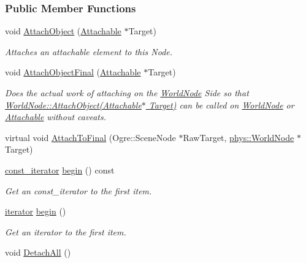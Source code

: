 \subsubsection*{Public Member Functions}
\begin{DoxyCompactItemize}
\item 
void \hyperlink{classphys_1_1WorldNode_a25b5a05bb87967fe21f153ce4418b43e}{AttachObject} (\hyperlink{classphys_1_1Attachable}{Attachable} $\ast$Target)
\begin{DoxyCompactList}\small\item\em Attaches an attachable element to this Node. \item\end{DoxyCompactList}\item 
void \hyperlink{classphys_1_1WorldNode_a6e4aa8bc4b916cfff06d03814a7dd80f}{AttachObjectFinal} (\hyperlink{classphys_1_1Attachable}{Attachable} $\ast$Target)
\begin{DoxyCompactList}\small\item\em Does the actual work of attaching on the \hyperlink{classphys_1_1WorldNode}{WorldNode} Side so that \hyperlink{classphys_1_1WorldNode_a25b5a05bb87967fe21f153ce4418b43e}{WorldNode::AttachObject(Attachable$\ast$ Target)} can be called on \hyperlink{classphys_1_1WorldNode}{WorldNode} or \hyperlink{classphys_1_1Attachable}{Attachable} without caveats. \item\end{DoxyCompactList}\item 
virtual void \hyperlink{classphys_1_1WorldNode_a398d3202233431eb3a2f110bd761f7a0}{AttachToFinal} (Ogre::SceneNode $\ast$RawTarget, \hyperlink{classphys_1_1WorldNode}{phys::WorldNode} $\ast$Target)
\item 
\hyperlink{classphys_1_1WorldNode_a76139100e549fd31310cd1bed75338ba}{const\_\-iterator} \hyperlink{classphys_1_1WorldNode_ac42af926430269aeb7d31b2753bb08d5}{begin} () const 
\begin{DoxyCompactList}\small\item\em Get an const\_\-iterator to the first item. \item\end{DoxyCompactList}\item 
\hyperlink{classphys_1_1WorldNode_ad7f553f256c4e500e35c36196db26287}{iterator} \hyperlink{classphys_1_1WorldNode_a3ea7e2d0a4191a936ac9bd4fb2671a97}{begin} ()
\begin{DoxyCompactList}\small\item\em Get an iterator to the first item. \item\end{DoxyCompactList}\item 
\hypertarget{classphys_1_1WorldNode_ab13dcee1719c95f8328eba2e2d7a94da}{
void \hyperlink{classphys_1_1WorldNode_ab13dcee1719c95f8328eba2e2d7a94da}{DetachAll} ()}
\label{classphys_1_1WorldNode_ab13dcee1719c95f8328eba2e2d7a94da}


\end{DoxyCompactItemize}
